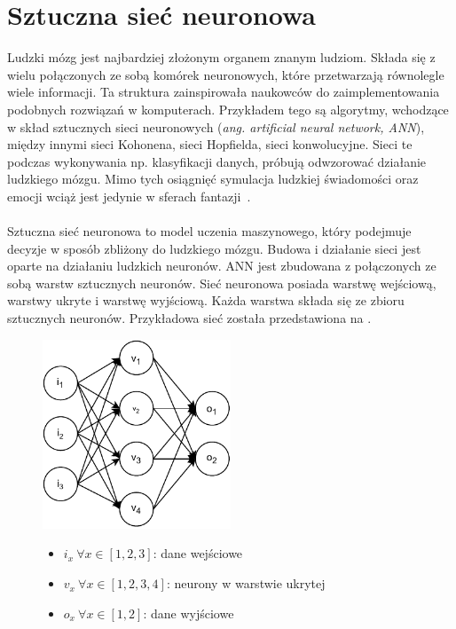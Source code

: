 \section{Sztuczna sieć neuronowa}
\label{sec:snn}
Ludzki mózg jest najbardziej złożonym organem znanym ludziom. Składa się z wielu połączonych ze sobą komórek neuronowych, które przetwarzają równolegle wiele informacji. Ta struktura zainspirowała naukowców do zaimplementowania podobnych rozwiązań w komputerach. Przykładem tego są algorytmy, wchodzące w skład sztucznych sieci neuronowych (\textit{ang. artificial neural network, ANN}), między innymi sieci Kohonena, sieci Hopfielda, sieci konwolucyjne. Sieci te podczas wykonywania np. klasyfikacji danych, próbują odwzorować działanie ludzkiego mózgu. Mimo tych osiągnięć symulacja ludzkiej świadomości oraz emocji wciąż jest jedynie w sferach fantazji~\cite{Wang2003}.
\\ \\
Sztuczna sieć neuronowa to model uczenia maszynowego, który podejmuje decyzje w sposób zbliżony do ludzkiego mózgu. Budowa i działanie sieci jest oparte na działaniu ludzkich neuronów. ANN jest zbudowana z połączonych ze sobą warstw sztucznych neuronów. Sieć neuronowa posiada warstwę wejściową, warstwy ukryte i warstwę wyjściową. Każda warstwa składa się ze zbioru sztucznych neuronów. Przykładowa sieć została przedstawiona na .
\begin{figure}[H]
    \centering
    \includegraphics[width=0.5\textwidth]{images/neural-network}
    \begin{itemize}
        \item[] $i_x \ \forall x \in [1, 2, 3]$: dane wejściowe
        \item[] $v_x \ \forall x \in [1, 2, 3, 4]$: neurony w warstwie ukrytej
        \item[] $o_x \ \forall x \in [1, 2]$: dane wyjściowe
    \end{itemize}
    \label{fig:neural-network}
\end{figure}


